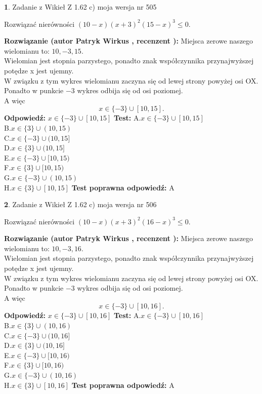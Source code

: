 \documentclass[12pt, a4paper]{article}
\theoremstyle{definition} %
\newtheorem{zad}{}
\newcommand{\zadStart}[1]{\begin{zad}#1\newline}
\newcommand{\zadStop}{\end{zad}}
\newcommand{\rozwStart}[2]{\noindent \textbf{Rozwiązanie (autor #1 , recenzent #2): }\newline}
\newcommand{\rozwStop}{\newline}
\newcommand{\odpStart}{\noindent \textbf{Odpowiedź:}\newline}
\newcommand{\odpStop}{\newline}
\newcommand{\testStart}{\noindent \textbf{Test:}\newline}
\newcommand{\testStop}{\newline}
\newcommand{\kluczStart}{\noindent \textbf{Test poprawna odpowiedź:}\newline}
\newcommand{\kluczStop}{\newline}
\begin{document}
\zadStart{Zadanie z Wikieł Z 1.62 c) moja wersja nr 505}

Rozwiązać nierówności $(10-x)(x+3)^{2}(15-x)^{3}\le0$.
\zadStop
\rozwStart{Patryk Wirkus}{}
Miejsca zerowe naszego wielomianu to: $10, -3, 15$.\\
Wielomian jest stopnia parzystego, ponadto znak współczynnika przy\linebreak najwyższej potędze x jest ujemny.\\ W związku z tym wykres wielomianu zaczyna się od lewej strony powyżej osi OX.\\
Ponadto w punkcie $-3$ wykres odbija się od osi poziomej.\\
A więc $$x \in \{-3\} \cup [10,15].$$
\rozwStop
\odpStart
$x \in \{-3\} \cup [10,15]$
\odpStop
\testStart
A.$x \in \{-3\} \cup [10,15]$\\
B.$x \in \{3\} \cup (10,15)$\\
C.$x \in \{-3\} \cup (10,15]$\\
D.$x \in \{3\} \cup (10,15]$\\
E.$x \in \{-3\} \cup [10,15)$\\
F.$x \in \{3\} \cup [10,15)$\\
G.$x \in \{-3\} \cup (10,15)$\\
H.$x \in \{3\} \cup [10,15]$
\testStop
\kluczStart
A
\kluczStop



\zadStart{Zadanie z Wikieł Z 1.62 c) moja wersja nr 506}

Rozwiązać nierówności $(10-x)(x+3)^{2}(16-x)^{3}\le0$.
\zadStop
\rozwStart{Patryk Wirkus}{}
Miejsca zerowe naszego wielomianu to: $10, -3, 16$.\\
Wielomian jest stopnia parzystego, ponadto znak współczynnika przy\linebreak najwyższej potędze x jest ujemny.\\ W związku z tym wykres wielomianu zaczyna się od lewej strony powyżej osi OX.\\
Ponadto w punkcie $-3$ wykres odbija się od osi poziomej.\\
A więc $$x \in \{-3\} \cup [10,16].$$
\rozwStop
\odpStart
$x \in \{-3\} \cup [10,16]$
\odpStop
\testStart
A.$x \in \{-3\} \cup [10,16]$\\
B.$x \in \{3\} \cup (10,16)$\\
C.$x \in \{-3\} \cup (10,16]$\\
D.$x \in \{3\} \cup (10,16]$\\
E.$x \in \{-3\} \cup [10,16)$\\
F.$x \in \{3\} \cup [10,16)$\\
G.$x \in \{-3\} \cup (10,16)$\\
H.$x \in \{3\} \cup [10,16]$
\testStop
\kluczStart
A
\kluczStop
\end{document}
